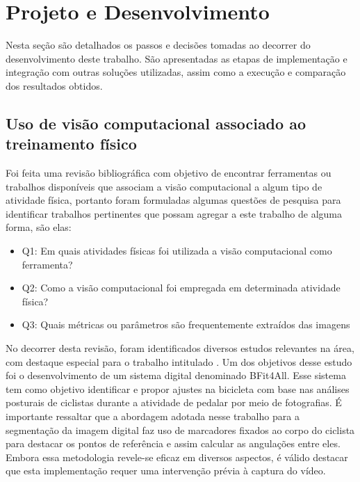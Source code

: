 \chapter{Projeto e Desenvolvimento}
Nesta seção são detalhados os passos e decisões tomadas ao decorrer do desenvolvimento deste trabalho. São apresentadas as etapas de implementação e integração com outras soluções utilizadas, assim como a execução e comparação dos resultados obtidos.

\section[Uso de visão computacional associado ao treinamento físico]{Uso de visão computacional associado ao treinamento físico}\label{sec:Uso de visao computacional associado ao treinamento fisico}

Foi feita uma revisão bibliográfica com objetivo de encontrar ferramentas ou trabalhos disponíveis que associam a visão computacional a algum tipo de atividade física, portanto foram formuladas algumas questões de pesquisa para identificar trabalhos pertinentes que possam agregar a este trabalho de alguma forma, são elas:
 \begin{itemize}
   \item Q1: Em quais atividades físicas foi utilizada a visão computacional como ferramenta?
   \item Q2: Como a visão computacional foi empregada em determinada atividade física?
   \item Q3: Quais métricas ou parâmetros são frequentemente extraídos das imagens
 \end{itemize}

No decorrer desta revisão, foram identificados diversos estudos relevantes na área, com destaque especial para o trabalho intitulado  \cite{vcBicicleta}. Um dos objetivos desse estudo foi o desenvolvimento de um sistema digital denominado BFit4All. Esse sistema tem como objetivo identificar e propor ajustes na bicicleta com base nas análises posturais de ciclistas durante a atividade de pedalar por meio de fotografias. É importante ressaltar que a abordagem adotada nesse trabalho para a segmentação da imagem digital faz uso de marcadores fixados ao corpo do ciclista para destacar os pontos de referência e assim calcular as angulações entre eles. Embora essa metodologia revele-se eficaz em diversos aspectos, é válido destacar que esta implementação requer uma intervenção prévia à captura do vídeo.

